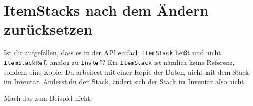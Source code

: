 \begin{Shaded}
\begin{Highlighting}[]
\OperatorTok{(}
    \OperatorTok{(}\OperatorTok{,} \OperatorTok{,} \OperatorTok{)}
          \OperatorTok{=} \OperatorTok{:}\OperatorTok{()}
             \OperatorTok{(}
                \OperatorTok{,}
                \OperatorTok{\{}  \OperatorTok{=}  \OperatorTok{\}}
            \OperatorTok{)}
             

\OperatorTok{)}
\end{Highlighting}
\end{Shaded}

\section{ItemStacks nach dem Ändern
zurücksetzen}\label{itemstacks-nach-dem-uxe4ndern-zuruxfccksetzen}

Ist dir aufgefallen, dass es in der API einfach
\texttt{ItemStack} heißt und nicht
\texttt{ItemStackRef}, analog zu \texttt{InvRef}? Ein \texttt{ItemStack}
ist nämlich keine Referenz, sondern eine Kopie. Du arbeitest mit einer
Kopie der Daten, nicht mit dem Stack im
Inventar. Änderst du den Stack, ändert sich der
Stack im Inventar also nicht.

Mach das zum Beispiel nicht:

\begin{Shaded}
\begin{Highlighting}[]
  \OperatorTok{=} \OperatorTok{:}\OperatorTok{()}
  \OperatorTok{=} \OperatorTok{:}\OperatorTok{(}\OperatorTok{,} \OperatorTok{)}
\OperatorTok{:}\OperatorTok{():}\OperatorTok{(}\OperatorTok{,} \OperatorTok{)}
\end{Highlighting}
\end{Shaded}

